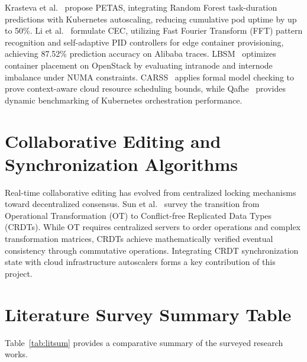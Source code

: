 \documentclass[12pt,a4paper]{report}
\begin{document}
Krasteva et al.~\cite{petas} propose PETAS, integrating Random Forest task-duration predictions with Kubernetes autoscaling, reducing cumulative pod uptime by up to 50\%. Li et al.~\cite{cec} formulate CEC, utilizing Fast Fourier Transform (FFT) pattern recognition and self-adaptive PID controllers for edge container provisioning, achieving 87.52\% prediction accuracy on Alibaba traces. LBSM~\cite{lbsm} optimizes container placement on OpenStack by evaluating intranode and internode imbalance under NUMA constraints. CARSS~\cite{carss} applies formal model checking to prove context-aware cloud resource scheduling bounds, while Qafhe~\cite{qafhe} provides dynamic benchmarking of Kubernetes orchestration performance.

\section{Collaborative Editing and Synchronization Algorithms}
Real-time collaborative editing has evolved from centralized locking mechanisms toward decentralized consensus. Sun et al.~\cite{crdtsurvey} survey the transition from Operational Transformation (OT) to Conflict-free Replicated Data Types (CRDTs). While OT requires centralized servers to order operations and complex transformation matrices, CRDTs achieve mathematically verified eventual consistency through commutative operations. Integrating CRDT synchronization state with cloud infrastructure autoscalers forms a key contribution of this project.

\clearpage
\section{Literature Survey Summary Table}
Table~\ref{tab:litsum} provides a comparative summary of the surveyed research works.
\end{document}
